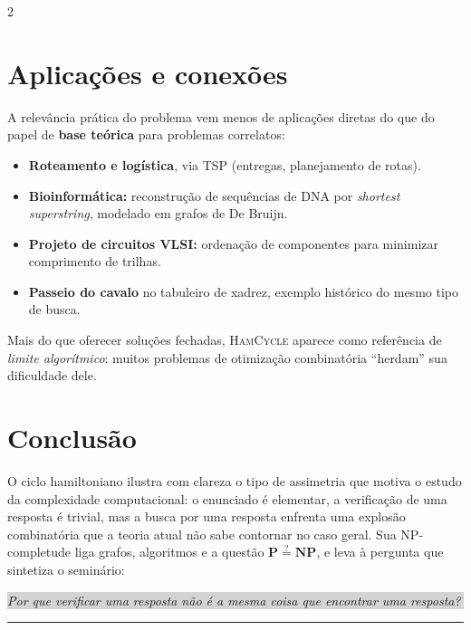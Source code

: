 \documentclass[10pt,a4paper]{article}
\theoremstyle{definition}
\newcommand{\guidebox}[1]{%
  \smallskip
  \noindent\colorbox{lightgray}{\parbox{\linewidth-2\fboxsep}{\small #1}}
  \smallskip
}
\begin{document}
\begin{multicols}{2}
\section{Aplicações e conexões}

A relevância prática do problema vem menos de aplicações diretas do que do papel de \textbf{base teórica} para problemas correlatos:

\begin{itemize}[leftmargin=*, itemsep=1pt]
  \item \textbf{Roteamento e logística}, via \textsc{TSP} (entregas, planejamento de rotas).
  \item \textbf{Bioinformática:} reconstrução de sequências de DNA por \emph{shortest superstring}, modelado em grafos de De Bruijn.
  \item \textbf{Projeto de circuitos VLSI:} ordenação de componentes para minimizar comprimento de trilhas.
  \item \textbf{Passeio do cavalo} no tabuleiro de xadrez, exemplo histórico do mesmo tipo de busca.
\end{itemize}

Mais do que oferecer soluções fechadas, \textsc{HamCycle} aparece como referência de \emph{limite algorítmico}: muitos problemas de otimização combinatória ``herdam'' sua dificuldade dele.

\section{Conclusão}

O ciclo hamiltoniano ilustra com clareza o tipo de assimetria que motiva o estudo da complexidade computacional: o enunciado é elementar, a verificação de uma resposta é trivial, mas a busca por uma resposta enfrenta uma explosão combinatória que a teoria atual não sabe contornar no caso geral. Sua NP-completude liga grafos, algoritmos e a questão $\mathbf{P} \stackrel{?}{=} \mathbf{NP}$, e leva à pergunta que sintetiza o seminário:

\guidebox{\textit{Por que verificar uma resposta não é a mesma coisa que encontrar uma resposta?}}

\end{multicols}

\vspace{-4pt}
\noindent\rule{\linewidth}{0.4pt}

\renewcommand{\bibsection}{\section*{\textcolor{mainblue}{Referências}}}


\end{document}
